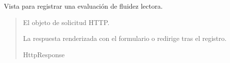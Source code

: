 \documentclass[letterpaper,10pt,spanish]{sphinxmanual}
\begin{document}
\begin{fulllineitems}

\pysigstartsignatures
{}
\pysigstopsignatures
\sphinxAtStartPar
Vista para registrar una evaluación de fluidez lectora.
\begin{quote}\begin{description}
\sphinxAtStartPar
{} \textendash{} El objeto de solicitud HTTP.

\sphinxAtStartPar
La respuesta renderizada con el formulario o redirige tras el registro.

\sphinxAtStartPar
HttpResponse

\end{description}\end{quote}

\end{fulllineitems}
\end{document}
